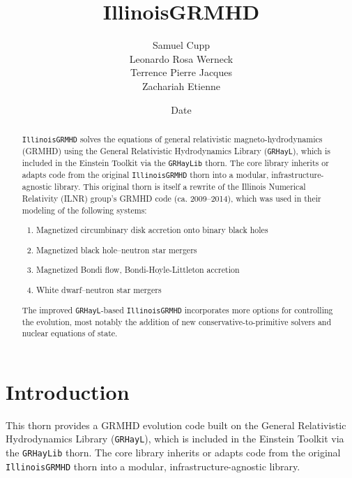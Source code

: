 \documentclass{article}
\begin{document}
\title{IllinoisGRMHD}
\author{Samuel Cupp \\ Leonardo Rosa Werneck \\ Terrence Pierre Jacques \\ Zachariah Etienne}
\date{$ $Date$ $}

\maketitle


\newcommand{\grhayl}{\texttt{GRHayL}}
\newcommand{\glib}{\texttt{GRHayLib}}
\newcommand{\ghd}{\texttt{GRHayLHD}}
\newcommand{\igm}{\texttt{IllinoisGRMHD}}
\newcommand{\hydrobase}{\texttt{HydroBase}}

\begin{abstract}
\igm{} solves the equations of general relativistic
magneto-hydrodynamics (GRMHD) using the General Relativistic
Hydrodynamics Library (\grhayl), which is included in the
Einstein Toolkit via the \glib{} thorn. The core library
inherits or adapts code from the original \igm{} thorn into a
modular, infrastructure-agnostic library. This original thorn
is itself a rewrite of the Illinois Numerical Relativity (ILNR)
group's GRMHD  code (ca. 2009--2014), which was used in their
modeling of the following systems:
\begin{enumerate}
\item Magnetized circumbinary disk accretion onto binary black holes
\item Magnetized black hole--neutron star mergers
\item Magnetized Bondi flow, Bondi-Hoyle-Littleton accretion
\item White dwarf--neutron star mergers
\end{enumerate}

The improved \grhayl-based \igm{} incorporates more options
for controlling the evolution, most notably the addition
of new conservative-to-primitive solvers and nuclear equations of
state.
\end{abstract}

\section{Introduction}

This thorn provides a GRMHD evolution code built on
the General Relativistic Hydrodynamics Library (\grhayl),
which is included in the Einstein Toolkit via the \glib{}
thorn. The core library inherits or adapts code from the
original \igm{} thorn into a modular, infrastructure-agnostic
library.
\end{document}
